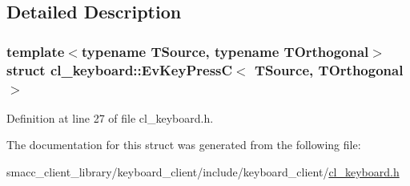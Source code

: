 \subsection{Detailed Description}
\subsubsection*{template$<$typename T\+Source, typename T\+Orthogonal$>$\newline
struct cl\+\_\+keyboard\+::\+Ev\+Key\+Press\+C$<$ T\+Source, T\+Orthogonal $>$}



Definition at line 27 of file cl\+\_\+keyboard.\+h.



The documentation for this struct was generated from the following file\+:\begin{DoxyCompactItemize}
\item 
smacc\+\_\+client\+\_\+library/keyboard\+\_\+client/include/keyboard\+\_\+client/\hyperlink{cl__keyboard_8h}{cl\+\_\+keyboard.\+h}\end{DoxyCompactItemize}
